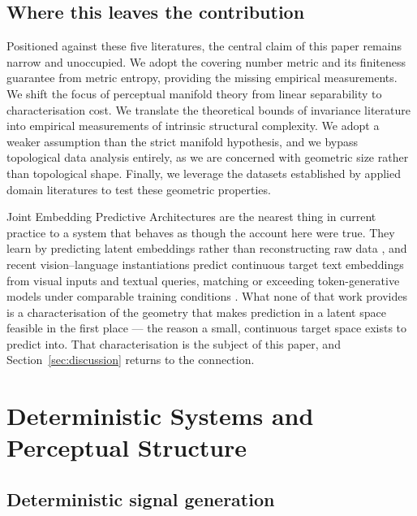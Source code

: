 \documentclass[10pt]{article}
\theoremstyle{plain}
\theoremstyle{definition}
\theoremstyle{remark}
\begin{document}
\subsection{Where this leaves the contribution}
\label{sec:rw-position}

Positioned against these five literatures, the central claim of this paper remains
narrow and unoccupied. We adopt the covering number metric and its
finiteness guarantee from metric entropy, providing the missing empirical
measurements. We shift the focus of perceptual manifold theory from linear
separability to characterisation cost. We translate the theoretical bounds of
invariance literature into empirical measurements of intrinsic structural complexity.
We adopt a weaker assumption than the strict manifold hypothesis, and we bypass
topological data analysis entirely, as we are concerned with geometric size rather
than topological shape. Finally, we leverage the datasets established by applied
domain literatures to test these geometric properties.

Joint Embedding Predictive Architectures are the nearest thing in current
practice to a system that behaves as though the account here were true. They
learn by predicting latent embeddings rather than reconstructing raw data
\citep{lecun2022path, assran2023self}, and recent vision--language
instantiations predict continuous target text embeddings from visual inputs and
textual queries, matching or exceeding token-generative models under comparable
training conditions \citep{chen2025vljepa}. What none of that work provides is a
characterisation of the geometry that makes prediction in a latent space
feasible in the first place --- the reason a small, continuous target space
exists to predict into. That characterisation is the subject of this paper, and
Section~\ref{sec:discussion} returns to the connection.

\section{Deterministic Systems and Perceptual Structure}
\label{sec:deterministic}

\subsection{Deterministic signal generation}
\end{document}
